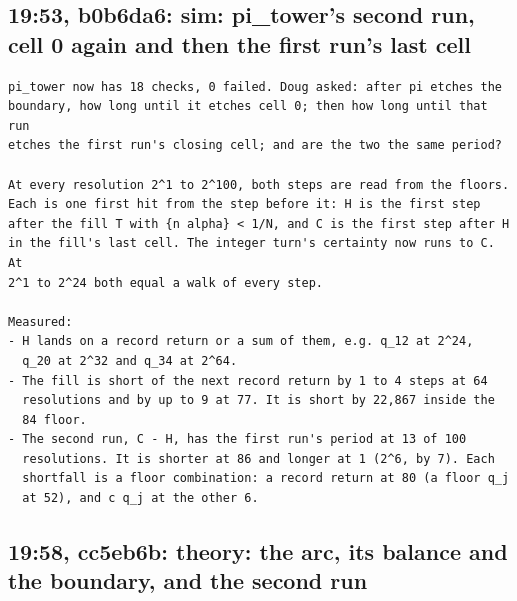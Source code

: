 \subsection{\texorpdfstring{19:53, b0b6da6: sim: pi\_\allowbreak{}tower's second run, cell 0 again and then the first run's last cell}{19:53, b0b6da6: sim: pi\_tower's second run, cell 0 again and then the first run's last cell}}

\begin{Verbatim}
pi_tower now has 18 checks, 0 failed. Doug asked: after pi etches the
boundary, how long until it etches cell 0; then how long until that run
etches the first run's closing cell; and are the two the same period?

At every resolution 2^1 to 2^100, both steps are read from the floors.
Each is one first hit from the step before it: H is the first step
after the fill T with {n alpha} < 1/N, and C is the first step after H
in the fill's last cell. The integer turn's certainty now runs to C. At
2^1 to 2^24 both equal a walk of every step.

Measured:
- H lands on a record return or a sum of them, e.g. q_12 at 2^24,
  q_20 at 2^32 and q_34 at 2^64.
- The fill is short of the next record return by 1 to 4 steps at 64
  resolutions and by up to 9 at 77. It is short by 22,867 inside the
  84 floor.
- The second run, C - H, has the first run's period at 13 of 100
  resolutions. It is shorter at 86 and longer at 1 (2^6, by 7). Each
  shortfall is a floor combination: a record return at 80 (a floor q_j
  at 52), and c q_j at the other 6.
\end{Verbatim}

\subsection{\texorpdfstring{19:58, cc5eb6b: theory: the arc, its balance and the boundary, and the second run}{19:58, cc5eb6b: theory: the arc, its balance and the boundary, and the second run}}

